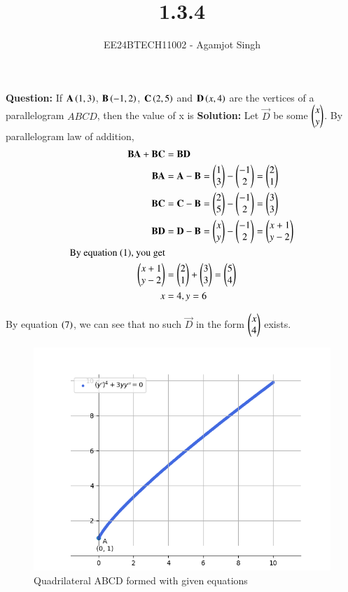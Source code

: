 \documentclass[journal]{IEEEtran}
\begin{document}

\vspace{3cm}

\title{1.3.4}
\author{EE24BTECH11002 - Agamjot Singh}
{\let\newpage\relax\maketitle}

\renewcommand{\thefigure}{\theenumi}
\renewcommand{\thetable}{\theenumi}
\setlength{\intextsep}{10pt} %

\textbf{Question:}
\newline
If $\mathbf{A}\left(1,3\right)$, $\mathbf{B}\left(-1,2\right)$, $\mathbf{C}\left(2,5\right)$ and $\mathbf{D}\left(x,4\right)$ are the vertices of a parallelogram $ABCD$, then the value of x is
\newline
\textbf{Solution:}
Let $\vec{D}$ be some $\begin{pmatrix}x\\y\end{pmatrix}$.
By parallelogram law of addition, 
\begin{align}
  \mathbf{BA} + \mathbf{BC} &= \mathbf{BD}\\
  \mathbf{BA} &= \mathbf{A} - \mathbf{B} = \begin{pmatrix}1\\3\end{pmatrix} - \begin{pmatrix}-1\\2\end{pmatrix} = \begin{pmatrix}2\\1\end{pmatrix}\\
  \mathbf{BC} &= \mathbf{C} - \mathbf{B} = \begin{pmatrix}2\\5\end{pmatrix} - \begin{pmatrix}-1\\2\end{pmatrix} = \begin{pmatrix}3\\3\end{pmatrix}\\
  \mathbf{BD} &= \mathbf{D} - \mathbf{B} = \begin{pmatrix}x\\y\end{pmatrix} - \begin{pmatrix}-1\\2\end{pmatrix} = \begin{pmatrix}x+1\\y-2\end{pmatrix}\\
  \text{By equation (1), you get}\\
  \begin{pmatrix}x+1\\y-2\end{pmatrix} &= \begin{pmatrix}2\\1\end{pmatrix} + \begin{pmatrix}3\\3\end{pmatrix} = \begin{pmatrix}5\\4\end{pmatrix}\\
  x &= 4, y = 6
\end{align}

By equation $\left(7\right)$, we can see that no such $\vec{D}$ in the form $\begin{pmatrix}x\\4\end{pmatrix}$ exists.

\begin{figure}[h!]
   \centering
   \includegraphics[width=0.7\linewidth]{figs/graph.png}
   \caption{Quadrilateral ABCD formed with given equations}
   \label{label}
\end{figure}
\end{document}
